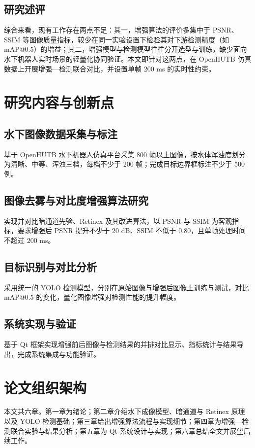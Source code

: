 \subsection{研究述评}
综合来看，现有工作存在两点不足：其一，增强算法的评价多集中于 PSNR、SSIM 等图像质量指标，较少在同一实验设置下检验其对下游检测精度（如 mAP@0.5）的增益；其二，增强模型与检测模型往往分开选型与训练，缺少面向水下机器人实时场景的轻量化协同验证。本文即针对这两点，在 OpenHUTB 仿真数据上开展增强—检测联合对比，并设置单帧 200 ms 的实时性约束。

\section{研究内容与创新点}

\subsection{水下图像数据采集与标注}
基于 OpenHUTB 水下机器人仿真平台采集 800 帧以上图像，按水体浑浊度划分为清晰、中等、浑浊三档，每档不少于 200 帧；完成目标边界框标注不少于 500 例。

\subsection{图像去雾与对比度增强算法研究}
实现并对比暗通道先验、Retinex 及其改进算法，以 PSNR 与 SSIM 为客观指标，要求增强后 PSNR 提升不少于 20 dB、SSIM 不低于 0.80，且单帧处理时间不超过 200 ms。

\subsection{目标识别与对比分析}
采用统一的 YOLO 检测模型，分别在原始图像与增强后图像上训练与测试，对比 mAP@0.5 的变化，量化图像增强对检测性能的提升幅度。

\subsection{系统实现与验证}
基于 Qt 框架实现增强前后图像与检测结果的并排对比显示、指标统计与结果导出，完成系统集成与功能验证。

\section{论文组织架构}

本文共六章。第一章为绪论；第二章介绍水下成像模型、暗通道与 Retinex 原理以及 YOLO 检测基础；第三章给出增强算法流程与实现细节；第四章为增强—检测联合实验与结果分析；第五章为 Qt 系统设计与实现；第六章总结全文并展望后续工作。
